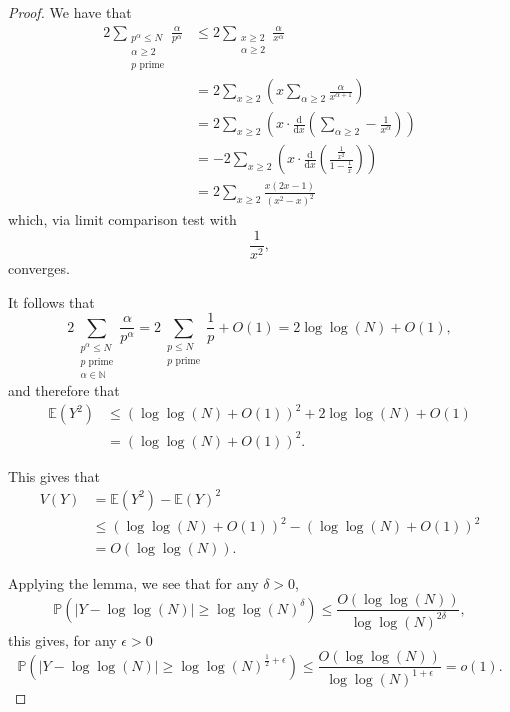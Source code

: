 \documentclass[12pt,reqno]{amsart}
\begin{document}
\begin{proof}
We have that
\begin{align*}
2 \sum _{\substack{ p ^{\alpha} \leq N \\ \alpha\geq 2\\ p \text{ prime} }} \frac{\alpha}{p ^{\alpha}} & \leq 2 \sum _{\substack{ x \geq 2 \\ \alpha \geq 2 }}  \frac{\alpha}{x ^{\alpha}} \\
& = 2\sum _{x \geq 2} \left( x \sum _{\alpha \geq 2} \frac{\alpha}{x ^{\alpha + 1}}  \right) \\
& = 2 \sum _{x \geq 2} \left( x \cdot \frac{\mathrm{d}}{\mathrm{d} x}\left( \sum _{\alpha \geq 2} - \frac{1}{x ^{\alpha}} \right)  \right) \\
& = -2 \sum _{x \geq 2} \left( x \cdot \frac{\mathrm{d}}{\mathrm{d} x}\left( \frac{\frac{1}{x^{2}} }{1 - \frac{1}{x} }  \right)  \right)\\
& = 2 \sum _{x \geq 2}  \frac{x (2x-1)}{\left( x^{2}-x \right) ^{2}}
\end{align*}
which, via limit comparison test with
\[
    \frac{1}{x^{2}} 
,\]
converges.

It follows that
\[
    2 \sum _{\substack{ p ^{\alpha} \leq N \\ p \text{ prime} \\ \alpha \in  \mathbb{N} }} \frac{\alpha}{p ^{\alpha}} = 2 \sum _{\substack{ p \leq N \\ p  \text{ prime} }} \frac{1}{p}  + O(1) = 2 \log\log \left( N \right) + O(1)
,\]
and therefore that
\begin{align*}
\mathbb{E} \left( Y^{2} \right) & \leq \left( \log\log \left( N \right) + O(1) \right)^{2} + 2 \log\log \left( N \right) + O(1)\\
& = \left( \log\log \left( N \right)  + O(1) \right) ^{2}. 
\end{align*}


This gives that
\begin{align*}
V(Y) & = \mathbb{E} \left( Y^{2} \right) - \mathbb{E} (Y)^{2}\\
& \leq \left( \log\log \left( N \right) + O(1) \right) ^{2} - \left( \log\log \left( N \right) + O(1) \right) ^{2}\\
& = O \left( \log\log \left( N \right)  \right).
\end{align*}

Applying the lemma, we see that for any \(\delta > 0\),
\[
    \mathbb{P} \left( \left\lvert Y - \log\log \left( N \right)  \right\rvert \geq \log\log \left( N \right) ^{\delta} \right) \leq \frac{O(\log\log \left( N \right) )}{\log\log \left( N \right) ^{2\delta}} 
,\]
this gives, for any \(\epsilon > 0\)
\[
    \mathbb{P} \left( \left\lvert Y - \log\log \left( N \right)  \right\rvert \geq \log\log \left( N \right) ^{\frac{1}{2} + \epsilon} \right) \leq \frac{O(\log\log \left( N \right) )}{\log\log \left( N \right) ^{1 + \epsilon}} = o(1) 
.\]


\end{proof}
\end{document}

